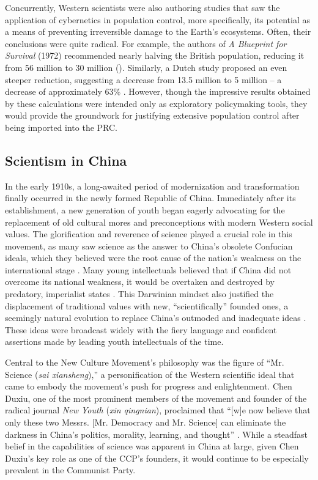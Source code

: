 \documentclass[12pt, a4paper, twoside]{article}
\begin{document}
Concurrently, Western scientists were also authoring studies that saw the application of cybernetics in population control, more specifically, its potential as a means of preventing irreversible damage to the Earth’s ecosystems. Often, their conclusions were quite radical. For example, the authors of \emph{A Blueprint for Survival} (1972) recommended nearly halving the British population, reducing it from 56 million to 30 million (\cites{Goldsmith1972}[p.\ 133]{Greenhalgh2008JustOneChild}[p.\ 359]{Kwakernaak1977}). Similarly, a Dutch study proposed an even steeper reduction, suggesting a decrease from 13.5 million to 5 million – a decrease of approximately 63\% \autocite[p.\ 359]{Kwakernaak1977}. However, though the impressive results obtained by these calculations were intended only as exploratory policymaking tools, they would provide the groundwork for justifying extensive population control after being imported into the PRC.

\subsection{Scientism in China}

In the early 1910s, a long-awaited period of modernization and transformation finally occurred in the newly formed Republic of China. Immediately after its establishment, a new generation of youth began eagerly advocating for the replacement of old cultural mores and preconceptions with modern Western social values. The glorification and reverence of science played a crucial role in this movement, as many saw science as the answer to China’s obsolete Confucian ideals, which they believed were the root cause of the nation’s weakness on the international stage \autocite[pp.\ 76--78]{Lee1987IronHouse}. Many young intellectuals believed that if China did not overcome its national weakness, it would be overtaken and destroyed by predatory, imperialist states \autocite[p.\ 34]{Uberoi1968Scientism}. This Darwinian mindset also justified the displacement of traditional values with new, “scientifically” founded ones, a seemingly natural evolution to replace China’s outmoded and inadequate ideas \autocite{Uberoi1968Scientism}. These ideas were broadcast widely with the fiery language and confident assertions made by leading youth intellectuals of the time.

Central to the New Culture Movement’s philosophy was the figure of “Mr. Science (\emph{sai xiansheng}),” a personification of the Western scientific ideal that came to embody the movement’s push for progress and enlightenment. Chen Duxiu, one of the most prominent members of the movement and founder of the radical journal \emph{New Youth} (\emph{xin qingnian}), proclaimed that “[w]e now believe that only these two Messrs. [Mr. Democracy and Mr. Science] can eliminate the darkness in China’s politics, morality, learning, and thought” \autocite[p.\ 280]{Fan2022MrScience}. While a steadfast belief in the capabilities of science was apparent in China at large, given Chen Duxiu's key role as one of the CCP’s founders, it would continue to be especially prevalent in the Communist Party.
\end{document}
